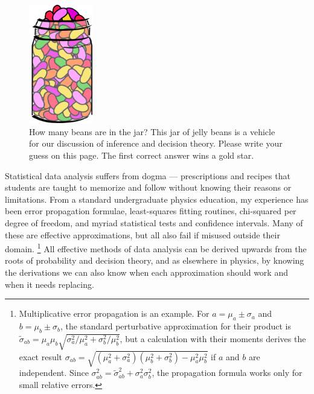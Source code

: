 \begin{figure}[tp]
\centering
\includegraphics[width=0.25\textwidth]{figures/searches_beans.pdf}
\caption[
How many beans are in the jar?
]{%
How many beans are in the jar? This jar of jelly beans is a vehicle for our
discussion of inference and decision theory.
Please write your guess on this page.
The first correct answer wins a gold star.
}
\label{fig:searches_beans}
\end{figure}

Statistical data analysis suffers from dogma --- prescriptions and recipes that
students are taught to memorize and follow without knowing their reasons or
limitations.
From a standard undergraduate physics education, my experience has been
error propagation formulae,
least-squares fitting routines,
chi-squared per degree of freedom,
and myriad statistical tests and confidence intervals.
Many of these are effective approximations, but all also fail if misused
outside their domain.%
\footnote{%
Multiplicative error propagation is an example.
For $a = \mu_a \pm \sigma_a$ and $b = \mu_b \pm \sigma_b$,
the standard perturbative approximation for their product is
\(
\widetilde{\sigma}_{ab}
= \mu_a \mu_b \sqrt{\sigma_a^2/\mu_a^2 + \sigma_b^2/\mu_b^2}
\),
but a calculation with their moments derives the exact result
\(
\sigma_{ab}
= \sqrt{(\mu_a^2 + \sigma_a^2)(\mu_b^2 + \sigma_b^2) - \mu_a^2\mu_b^2}
\)
if $a$ and $b$ are independent.
Since $\sigma_{ab}^2 = \widetilde{\sigma}_{ab}^2 + \sigma_a^2 \sigma_b^2$, the
propagation formula works only for small relative errors.
}
All effective methods of data analysis can be derived upwards from the roots of
probability and decision theory, and as elsewhere in physics, by knowing the
derivations we can also know when each approximation should work and when it
needs replacing.

